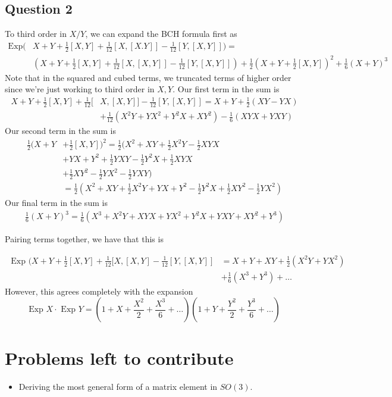 \documentclass[11pt, oneside]{article}   	%
\theoremstyle{slanted}
\begin{document}
\subsection{Question 2} 
To third order in $ X / Y $, we can expand the BCH formula first as 
\begin{align*}
	\text{Exp}(&  X + Y + \frac{1}{2 } [ X, Y ] + \frac{1}{12 } [ X, [ X. Y ] ]  - \frac{1}{12 } [ Y , [ X, Y ] ] ) = \\ 
    &	\left( X + Y + \frac{1}{2 } [ X, Y ] + \frac{1}{12 } [ X , [ X, Y ] ] - \frac{1}{12 } [ Y, [ X, Y ] ] \right)  + \frac{1}{2 } \left( X+ Y + \frac{1}{2 } [ X, Y ] \right) ^ 2 + \frac{1}{6}\left( X+ Y \right) ^ 3 
\end{align*}
Note that in the squared and cubed terms, we truncated terms of 
higher order since we're just working to third order in $ X, Y $.
Our first term in the sum is 
\begin{align*}
	X + Y + \frac{1}{2 } [ X , Y ] + \frac{1}{12 } [ & X, [ X, Y ] ] - \frac{1}{12 } [ Y , [ X, Y ] ] =  X + Y + \frac{1}{2 } ( XY - Y X )  \\
													&+   \frac{1}{12 } ( X^ 2 Y + Y X^ 2 + Y ^ 2 X+ X Y ^ 2 )  -\frac{1}{6 } ( XYX + YXY )  
\end{align*}
Our second term in the sum is 
\begin{align*}
	\frac{1}{2}( X + Y  & + \frac{1}{2 } [ X, Y ] )^ 2 = \frac{1}{2} ( X^ 2 + XY + \frac{1}{2 } X^ 2 Y - \frac{1}{2 } XY X    \\
			    & + Y X+ Y ^ 2 + \frac{1}{2} YXY - \frac{1}{ 2 } Y ^ 2 X + \frac{1}{2 } XYX \\
			    & + \frac{1}{2 } XY ^ 2 - \frac{1}{2 } Y X^ 2 - \frac{1}{2 } YXY ) \\
			    & = \frac{1}{2 } ( X ^ 2 + XY + \frac{1}{2 } X^2 Y + Y X + Y ^ 2 - \frac{1}{2 } Y ^ 2 X + \frac{1}{2 } XY ^ 2 - \frac{1}{2 } Y X^ 2 ) 
\end{align*}
Our final term in the sum is 
\begin{align*}
	\frac{1}{6}( X + Y ) ^ 3 = \frac{1}{6}( X^ 3 + X^2 Y + X Y X + Y X^ 2  + Y ^ 2 X + Y XY + XY ^ 2 + Y ^ 3 ) 
\end{align*}

Pairing terms together, we have that this is 

\begin{align*}
	\text{ Exp } ( X + Y + \frac{1}{2 } [ X, Y ] + \frac{1}{1 2} [ X, [ X, Y ] - \frac{1}{12 } [ Y , [ X, Y ]] & = 
	X + Y + XY + \frac{1}{2 } ( X^ 2 Y + Y X ^ 2 ) \\
														   & + \frac{1}{6 } ( X^3 + Y ^ 3 ) + \dots
\end{align*}
However, this agrees completely with the expansion 
\[
	\text{Exp } X \cdot  \text{ Exp } Y = \left(  1 + X + \frac{X^ 2 }{ 2 } + \frac{X^ 3 }{ 6}  + \dots  \right) \left( 1 + Y + \frac{ Y ^ 2 }{2 } + \frac{ Y ^ 3 }{ 6 } + \dots \right)  
\] 
\section{Problems left to contribute}
\begin{itemize}
	\item Deriving the most general form of a matrix element in $SO(3)$. 
\end{itemize}
\end{document}
